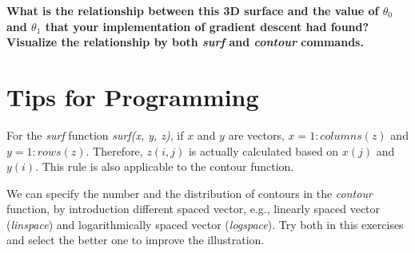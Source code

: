 \documentclass[10pt,a4paper]{article}
\begin{document}
  \textbf{What is the relationship between this 3D surface and the value of $\theta_0$ and $\theta_1$ that your implementation of gradient descent had found? Visualize the relationship by both \emph{surf} and \emph{contour} commands.}


\section{Tips for Programming}
%
 For the \emph{surf} function \emph{surf(x, y, z)}, if $x$ and $y$ are vectors, $x = 1:columns(z)$ and $y=1:rows(z)$. Therefore, $z(i, j)$ is actually calculated based on $x(j)$ and $y(i)$. This rule is also applicable to the contour function.

 We can specify the number and the distribution of contours in the \emph{contour} function, by introduction different spaced vector, e.g., linearly spaced vector (\emph{linspace}) and logarithmically spaced vector (\emph{logspace}). Try both in this exercises and select the better one to improve the illustration. 
\end{document}
